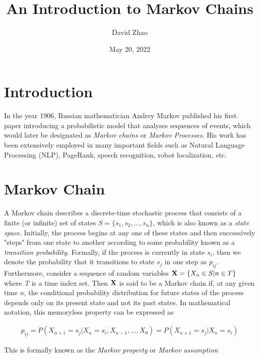 \documentclass[a4paper,12pt]{article}
\theoremstyle{definition}
\let\oldtextbf\mathbf
\renewcommand{\mathbf}[1]{\oldtextbf{\boldmath #1}}
\begin{document}
\title{An Introduction to Markov Chains}
\author{David Zhao}
\date{May 20, 2022}
\maketitle
{}

\section*{Introduction}

In the year 1906, Russian mathematician Andrey Markov published his first paper
introducing a probabilistic model that analyses sequences of events, 
which would later be designated as \emph{Markov chains} or \emph{Markov Processes}. His work has been extensively employed
in many important fields such as Natural Language Processing (NLP), PageRank, speech recognition, robot localization, etc.

\section{Markov Chain}

	A Markov chain describes a discrete-time stochastic process that consists of a finite (or infinite) set of states 
	$S = \{s_1, s_2, ..., s_n \}$, which is also known as a \emph{state space}. Initially, the process begins at any 
	one of these states and then successively "steps" from one state to another according to some probability known as 
	a \emph{transition probability}. Formally, if the process is currently in state $s_i$, then we denote the probability 
	that it transitions to state $s_j$ in one step as $p_{ij}$.
	\newline
	Furthermore, consider a sequence of random variables $\mathbf{X} = \{X_n \in S | n \in T\}$ where \emph{T} is a time index 
	set. Then $\mathbf{X}$ is said to be a Markov chain if, at any given time $n$, the conditional probability distribution for future states
	of the process depends only on its present state and not its past states. In mathematical notation, this memoryless
	property can be expressed as

	\begin{equation*}
		\begin{aligned}
			p_{ij} = P(X_{n+1} = s_j | X_{n} = s_i, X_{n-1}, ... , X_0) = P(X_{n+1} = s_j | X_{n}= s_i)
		\end{aligned}
	\end{equation*}

	This is formally known as the \emph{Markov property} or \emph{Markov assumption}
	
\end{document}
